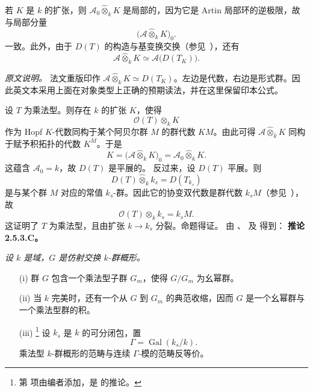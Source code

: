 若 \(K\) 是 \(k\) 的扩张，则 \(\mathcal A_0\widehat\otimes_k K\) 是局部的，因为它是 Artin 局部环的逆极限，故与局部分量
\[
  \bigl(\mathcal A\widehat\otimes_k K\bigr)_0.
\]
一致。此外，由于 \(D(T)\) 的构造与基变换交换\textup{（参见\ ）}，还有
\[
  \mathcal A\widehat\otimes_k K
  \simeq
  \mathcal A\bigl(D(T_K)\bigr).
\]
\noindent\begin{minipage}{\linewidth}
\label{sga3:VIIB:2.5.3.B:base-change-source-note}
\textit{原文说明。}\enspace
法文重版印作 \(\mathcal A\widehat\otimes_k K\simeq D(T_K)\)。左边是代数，右边是形式群。因此英文本采用上面在对象类型上正确的预期读法，并在这里保留印本公式。
\end{minipage}
设 \(T\) 为乘法型。则存在 \(k\) 的扩张 \(K\)，使得
\[
  \mathcal O(T)\otimes_k K
\]
作为 Hopf \(K\)-代数同构于某个阿贝尔群 \(M\) 的群代数 \(KM\)。由此可得 \(\mathcal A\widehat\otimes_k K\) 同构于赋予积拓扑的代数 \(K^M\)。于是
\[
  K
  =
  \bigl(\mathcal A\widehat\otimes_k K\bigr)_0
  =
  \mathcal A_0\widehat\otimes_k K.
\]
这蕴含 \(\mathcal A_0=k\)，故 \(D(T)\) 是平展的。
反过来，设 \(D(T)\) 平展。则
\[
  D(T)\widehat\otimes_k k_s
  =
  D(T_{k_s})
\]
是与某个群 \(M\) 对应的常值 \(k_s\)-群。因此它的协变双代数是群代数 \(k_sM\)\textup{（参见\ ）}，故
\[
  \mathcal O(T)\otimes_k k_s=k_sM.
\]
这证明了 \(T\) 为乘法型，且由扩张 \(k\to k_s\) 分裂。命题得证。
由 、 及  得到：
\medskip
\noindent\textbf{推论 2.5.3.C。}
\label{sga3:VIIB:2.5.3.C}
{\itshape 设 \(k\) 是域，\(G\) 是仿射交换 \(k\)-群概形。
\begin{enumerate}
\item[\textup{(i)}] 群 \(G\) 包含一个乘法型子群 \(G_m\)，使得 \(G/G_m\) 为幺幂群。
\item[\textup{(ii)}] 当 \(k\) 完美时，还有一个从 \(G\) 到 \(G_m\) 的典范收缩，因而 \(G\) 是一个幺幂群与一个乘法型群的积。
\item[\textup{\SGAInlineRefTarget{sga3:VIIB:2.5.3.C:item:iii}(iii)}]
\footnote{\label{sga3:VIIB:nde:106}第\textup{} 项由编者添加，是 的推论。}
设 \(k_s\) 是 \(k\) 的可分闭包，置
\[
  \Gamma=\operatorname{Gal}(k_s/k).
\]
乘法型 \(k\)-群概形的范畴与连续 \(\Gamma\)-模的范畴反等价。
\end{enumerate}}
